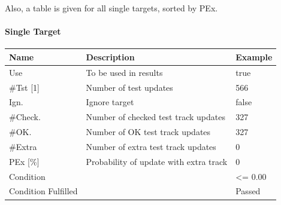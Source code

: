 Also, a table is given for all single targets, sorted by PEx.

\paragraph{Single Target}

\begin{center}
 \begin{table}[H]
  \begin{tabularx}{\textwidth}{ | l | X |  l | }
    \hline
    \textbf{Name} & \textbf{Description} & \textbf{Example} \\ \hline
    Use & To be used in results & true \\ \hline
    \#Tst [1] & Number of test updates & 566 \\ \hline
    Ign. & Ignore target & false \\ \hline
    \#Check. & Number of checked test track updates & 327 \\ \hline
    \#OK. & Number of OK test track updates & 327 \\ \hline
    \#Extra & Number of extra test track updates & 0 \\ \hline
    PEx [\%] & Probability of update with extra track & 0 \\ \hline
    Condition &  & <= 0.00 \\ \hline
    Condition Fulfilled &  & Passed \\ \hline
\end{tabularx}
\end{table}
\end{center}
